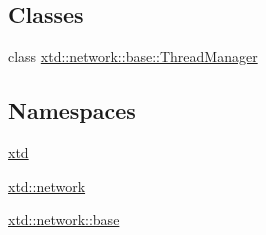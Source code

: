 \subsection*{Classes}
\begin{DoxyCompactItemize}
\item 
class \hyperlink{classxtd_1_1network_1_1base_1_1ThreadManager}{xtd\+::network\+::base\+::\+Thread\+Manager}
\end{DoxyCompactItemize}
\subsection*{Namespaces}
\begin{DoxyCompactItemize}
\item 
 \hyperlink{namespacextd}{xtd}
\item 
 \hyperlink{namespacextd_1_1network}{xtd\+::network}
\item 
 \hyperlink{namespacextd_1_1network_1_1base}{xtd\+::network\+::base}
\end{DoxyCompactItemize}
